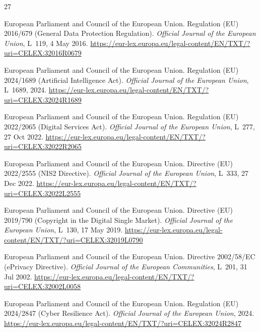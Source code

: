 \documentclass[11pt,a4paper]{article}
\begin{document}
\begin{thebibliography}{27}

European Parliament and Council of the European Union.
\newblock Regulation (EU) 2016/679 (General Data Protection Regulation).
\newblock \emph{Official Journal of the European Union}, L~119, 4 May 2016.
\newblock \url{https://eur-lex.europa.eu/legal-content/EN/TXT/?uri=CELEX:32016R0679}

European Parliament and Council of the European Union.
\newblock Regulation (EU) 2024/1689 (Artificial Intelligence Act).
\newblock \emph{Official Journal of the European Union}, L~1689, 2024.
\newblock \url{https://eur-lex.europa.eu/legal-content/EN/TXT/?uri=CELEX:32024R1689}

European Parliament and Council of the European Union.
\newblock Regulation (EU) 2022/2065 (Digital Services Act).
\newblock \emph{Official Journal of the European Union}, L~277, 27 Oct 2022.
\newblock \url{https://eur-lex.europa.eu/legal-content/EN/TXT/?uri=CELEX:32022R2065}

European Parliament and Council of the European Union.
\newblock Directive (EU) 2022/2555 (NIS2 Directive).
\newblock \emph{Official Journal of the European Union}, L~333, 27 Dec 2022.
\newblock \url{https://eur-lex.europa.eu/legal-content/EN/TXT/?uri=CELEX:32022L2555}

European Parliament and Council of the European Union.
\newblock Directive (EU) 2019/790 (Copyright in the Digital Single Market).
\newblock \emph{Official Journal of the European Union}, L~130, 17 May 2019.
\newblock \url{https://eur-lex.europa.eu/legal-content/EN/TXT/?uri=CELEX:32019L0790}

European Parliament and Council of the European Union.
\newblock Directive 2002/58/EC (ePrivacy Directive).
\newblock \emph{Official Journal of the European Communities}, L~201, 31 Jul 2002.
\newblock \url{https://eur-lex.europa.eu/legal-content/EN/TXT/?uri=CELEX:32002L0058}

European Parliament and Council of the European Union.
\newblock Regulation (EU) 2024/2847 (Cyber Resilience Act).
\newblock \emph{Official Journal of the European Union}, 2024.
\newblock \url{https://eur-lex.europa.eu/legal-content/EN/TXT/?uri=CELEX:32024R2847}


\end{thebibliography}
\end{document}
